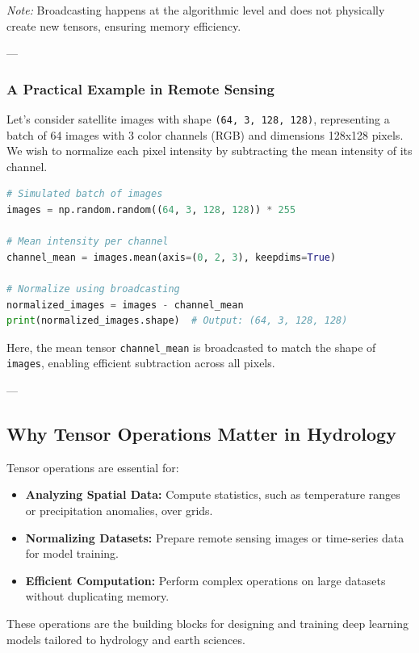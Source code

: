 \textit{Note:} Broadcasting happens at the algorithmic level and does not physically create new tensors, ensuring memory efficiency.

---

\subsubsection{A Practical Example in Remote Sensing}

Let’s consider satellite images with shape \texttt{(64, 3, 128, 128)}, representing a batch of 64 images with 3 color channels (RGB) and dimensions 128x128 pixels. We wish to normalize each pixel intensity by subtracting the mean intensity of its channel.

\begin{lstlisting}[language=Python]
# Simulated batch of images
images = np.random.random((64, 3, 128, 128)) * 255

# Mean intensity per channel
channel_mean = images.mean(axis=(0, 2, 3), keepdims=True)

# Normalize using broadcasting
normalized_images = images - channel_mean
print(normalized_images.shape)  # Output: (64, 3, 128, 128)
\end{lstlisting}

Here, the mean tensor \texttt{channel\_mean} is broadcasted to match the shape of \texttt{images}, enabling efficient subtraction across all pixels.

---

\subsection{Why Tensor Operations Matter in Hydrology}

Tensor operations are essential for:
\begin{itemize}
    \item \textbf{Analyzing Spatial Data:} Compute statistics, such as temperature ranges or precipitation anomalies, over grids.
    \item \textbf{Normalizing Datasets:} Prepare remote sensing images or time-series data for model training.
    \item \textbf{Efficient Computation:} Perform complex operations on large datasets without duplicating memory.
\end{itemize}

These operations are the building blocks for designing and training deep learning models tailored to hydrology and earth sciences.


